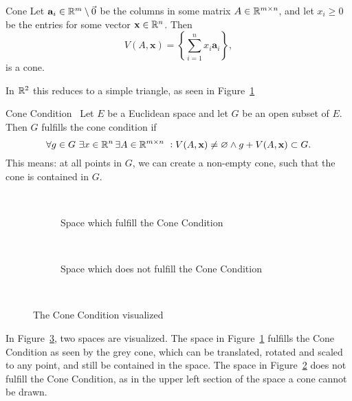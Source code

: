 \begin{defn}{Cone}
Let $\mathbf{a}_i\in\mathbb{R}^m\setminus\vec{0}$ be the columns in some matrix 
$A\in \mathbb{R}^{m \times n}$, and let $x_i\geq 0$ be the entries for some vector $\mathbf{x}\in \mathbb{R}^n$.
 Then
\begin{equation*}
    V(A,\mathbf{x}) =\left \{ \sum_{i=1}^{n} x_i \mathbf{a}_i \right \},
\end{equation*}
is a cone. 
\end{defn}
In $\mathbb{R}^2$ this reduces to a simple triangle, as seen in Figure~\ref{fig:cone_condition_true}
\begin{defn}{Cone Condition}~\label{def:cone_condition}
    Let $E$ be a Euclidean space and let $G$ be an open subset of $E$.
    Then $G$ fulfills the cone condition if
    \begin{equation*}
        \forall g \in G\,\, \exists x\in \RR^n
        \, \exists A\in \RR^{m \times n} \,\, :
        V(A,\mathbf{x})\neq \varnothing \land
        g + V(A, \mathbf{x}) \subset G. %
    \end{equation*}
    This means: at all points in $G$, we can create a non-empty cone,
     such that the cone is contained 
    in $G$.
\end{defn}

\begin{figure}[H]
    \centering
    \begin{subfigure}{.3\textwidth}
        \centering
        
        \caption{Space which fulfill the Cone Condition}~\label{fig:cone_condition_true}
      \end{subfigure}
    \begin{subfigure}{.3\textwidth}
        \centering
        
        \caption{Space which does not fulfill the Cone Condition}~\label{fig:cone_condition_false}
      \end{subfigure}
      \caption{The Cone Condition visualized}~\label{fig:cone_condition_visu}
\end{figure}
In Figure~\ref{fig:cone_condition_visu}, two spaces are visualized.
 The space in Figure~\ref{fig:cone_condition_true} fulfills the Cone Condition as seen 
 by the grey cone, which can be translated, rotated and scaled to any point, and still 
 be contained in the space. The space  
 in Figure~\ref{fig:cone_condition_false} does not fulfill the Cone Condition, as
in the upper left section of the space a cone cannot be drawn.

